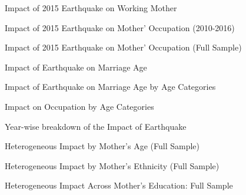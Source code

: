 \documentclass[11pt,a4paper]{article}
\begin{document}
\newpage
\begin{table}[htbp]
    \caption{Impact of 2015 Earthquake on Working Mother}
    \label{tab:mom working mechanism}
    
\end{table}


\newpage
\begin{table}[htbp]
    \caption{Impact of 2015 Earthquake on Mother' Occupation (2010-2016)}
    \label{tab:mom occupation summary}
    
\end{table}


\newpage
\begin{table}[htbp]
    \caption{Impact of 2015 Earthquake on Mother' Occupation (Full Sample)}
    \label{tab:mom occupation full sample summary}
    
\end{table}

\newpage
\begin{table}[htbp]
    \caption{Impact of Earthquake on Marriage Age}
    \label{tab:marriage age mechanism summary}
    
\end{table}


\newpage
\begin{table}[htbp]
    \caption{Impact of Earthquake on Marriage Age by Age Categories}
    \label{tab:marriage age by age category}
    
\end{table}


\newpage
\begin{table}[htbp]
    \caption{Impact on Occupation by Age Categories}
    \label{tab:mom_agegroup_occupation}
    
\end{table}


\newpage
\begin{table}[htbp]
    \caption{Year-wise breakdown of the Impact of Earthquake}
    \label{tab:year wise table}
    
\end{table}


\newpage
\begin{table}[htbp]
    \centering
    \caption{Heterogeneous Impact by Mother's Age (Full Sample)}
    \label{tab:Full Sample mother's age summary}
    
\end{table}

\newpage
\begin{table}[htbp]
    \caption{Heterogeneous Impact by Mother's Ethnicity (Full Sample)}
    \label{tab:ethnicity full}
    
\end{table}

\newpage
\begin{table}[htbp]
    \caption{Heterogeneous Impact Across Mother's Education: Full Sample}
    \label{tab:mother's education full}
    
\end{table}
\end{document}
